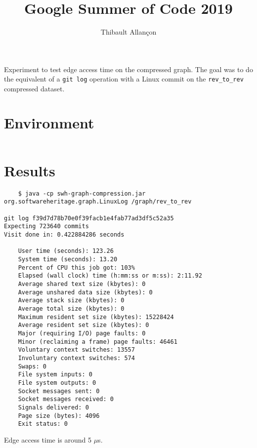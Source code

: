 \documentclass[11pt,a4paper]{article}
\title{Google Summer of Code 2019}
\author{Thibault Allançon}
\begin{document}
\maketitle

Experiment to test edge access time on the compressed graph. The goal was to do
the equivalent of a \texttt{git log} operation with a Linux commit on
the \texttt{rev_to_rev} compressed dataset.

\section{Environment}

\begin{footnotesize}
\inputminted{java}{LinuxLog.java}
\end{footnotesize}

\section{Results}

\begin{small}
\begin{verbatim}
    $ java -cp swh-graph-compression.jar org.softwareheritage.graph.LinuxLog /graph/rev_to_rev

git log f39d7d78b70e0f39facb1e4fab77ad3df5c52a35
Expecting 723640 commits
Visit done in: 0.422884286 seconds

    User time (seconds): 123.26
    System time (seconds): 13.20
    Percent of CPU this job got: 103%
    Elapsed (wall clock) time (h:mm:ss or m:ss): 2:11.92
    Average shared text size (kbytes): 0
    Average unshared data size (kbytes): 0
    Average stack size (kbytes): 0
    Average total size (kbytes): 0
    Maximum resident set size (kbytes): 15228424
    Average resident set size (kbytes): 0
    Major (requiring I/O) page faults: 0
    Minor (reclaiming a frame) page faults: 46461
    Voluntary context switches: 13557
    Involuntary context switches: 574
    Swaps: 0
    File system inputs: 0
    File system outputs: 0
    Socket messages sent: 0
    Socket messages received: 0
    Signals delivered: 0
    Page size (bytes): 4096
    Exit status: 0
\end{verbatim}
\end{small}

Edge access time is around 5 $\mu$s.
\end{document}
